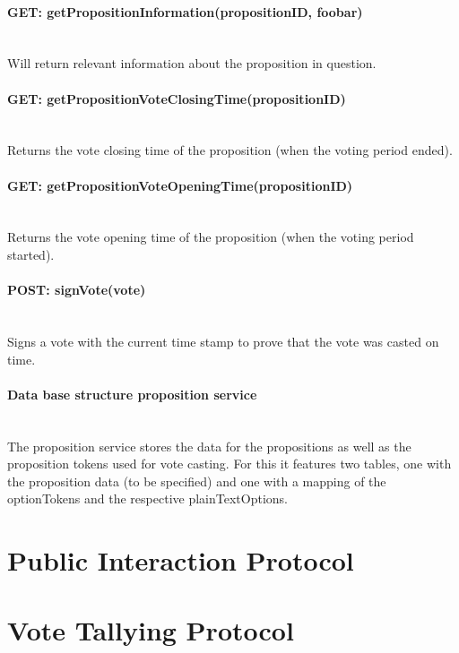  \paragraph*{GET: getPropositionInformation(propositionID, foobar)} \mbox{} \\
 Will return relevant information about the proposition in question.

 \paragraph*{GET: getPropositionVoteClosingTime(propositionID)} \mbox{} \\
 Returns the vote closing time of the proposition (when the voting period ended).

 \paragraph*{GET: getPropositionVoteOpeningTime(propositionID)} \mbox{} \\
 Returns the vote opening time of the proposition (when the voting period started).

 \paragraph*{POST: signVote(vote)} \mbox{} \\
 Signs a vote with the current time stamp to prove that the vote was casted on time. 

 \paragraph*{Data base structure proposition service} \mbox{} \\
 The proposition service stores the data for the propositions as well as the proposition tokens used for vote casting. For this it features two tables, one with the proposition data (to be specified) and one with a mapping of the optionTokens and the respective plainTextOptions.




\section{Public Interaction Protocol}
\label{sec:PublicInteractionProtocol}

\section{Vote Tallying Protocol}
\label{sec:VoteTallyingProtocol}

